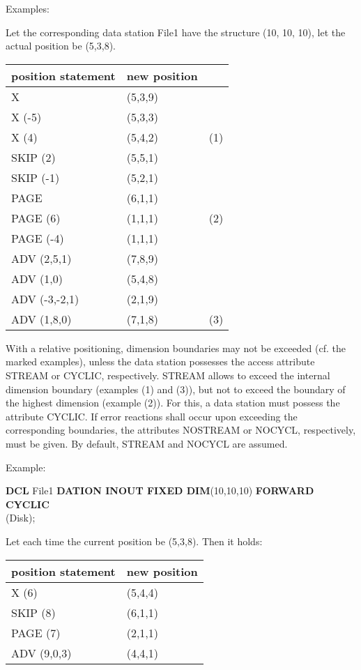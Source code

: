 Examples:

Let the corresponding data station File1 have the structure (10, 10,
10), let the actual position be (5,3,8).

\begin{tabular}{l@{\x}l@{\x}l}
position statement   & new position &     \\ \hline
X                    & (5,3,9)      &     \\
X (-5)               & (5,3,3)      &     \\
X (4)                & (5,4,2)      & (1) \\
SKIP (2)             & (5,5,1)      &     \\
SKIP (-1)            & (5,2,1)      &     \\
PAGE                 & (6,1,1)      &     \\
PAGE (6)             & (1,1,1)      & (2) \\
PAGE (-4)            & (1,1,1)      &     \\
ADV (2,5,1)          & (7,8,9)      &     \\
ADV (1,0)            & (5,4,8)      &     \\
ADV (-3,-2,1)        & (2,1,9)      &     \\
ADV (1,8,0)          & (7,1,8)      & (3)
\end{tabular}

With a relative positioning, dimension boundaries may not be exceeded
(cf. the marked examples), unless the data station possesses the access
attribute STREAM or CYCLIC, respectively. STREAM allows to exceed the
internal dimension boundary (examples (1) and (3)), but not to exceed
the boundary of the highest dimension (example (2)). For this, a data
station must possess the attribute CYCLIC. If error reactions shall
occur upon exceeding the corresponding boundaries, the attributes
NOSTREAM or NOCYCL, respectively, must be given. By default, STREAM and
NOCYCL are assumed.

Example:

{\bf DCL} File1 {\bf DATION INOUT FIXED DIM}(10,10,10) {\bf FORWARD CYCLIC}\\
(Disk);

Let each time the current position be (5,3,8). Then it holds:

\begin{tabular}{l@{\x}l}
position statement   & new position \\ \hline
X (6)                & (5,4,4)      \\
SKIP (8)             & (6,1,1)      \\
PAGE (7)             & (2,1,1)      \\
ADV (9,0,3)          & (4,4,1)
\end{tabular}

